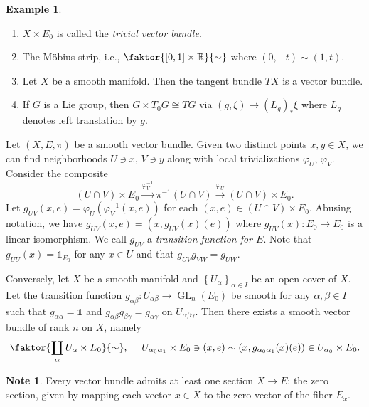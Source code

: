 \documentclass[10pt,letterpaper,cm]{nupset}
\theoremstyle{definition}
\newtheorem{exmp}[definition]{Example}
\newtheorem{note}[definition]{Note}
\theoremstyle{theorem}
\theoremstyle{remark}
\newcommand{\R}{\mathbb{R}}
\newcommand{\1}{\mathbb{1}}
\newcommand{\0}{\vec 0}
\DeclareMathOperator{\GL}{GL}
\begin{document}
\begin{exmp} $ $
\begin{enumerate}
\item $X \times E_0$ is called the \textit{trivial vector bundle}.
\item  The M\"obius strip, i.e., $\faktor{[0,1]\times \R}{\sim}$ where $(0, {-t}) \sim (1, t)$.
\item Let $X$ be a smooth manifold. Then the tangent bundle $T{X}$ is a vector bundle. 
\item If $G$ is a Lie group, then $ G \times T_0{G} \cong T{G}$ via $ (g, \xi) \mapsto \left(L_g\right)_{\ast}{\xi}$ where  $L_g$ denotes left translation by $g$. 
\end{enumerate}
\end{exmp}

\medskip

Let $(X, E, \pi)$ be a smooth vector bundle. Given two distinct points $x,y \in X$, we can find neighborhoods $U\ni x$, $V\ni y$ along with local trivializations $\varphi_U$, $\varphi_V$. Consider the composite $$ \left(U \cap V\right) \times E_0 \overset{\varphi^{-1}_V}{\longrightarrow} \pi^{-1}\left(U \cap V\right) \overset{\varphi_U}{\longrightarrow} \left(U \cap V\right) \times E_0    .$$ Let $g_{UV}(x,e) = \varphi_U(\varphi_V^{-1}(x,e))$ for each $(x,e) \in \left(U \cap V\right) \times E_0$. Abusing notation, we have $g_{UV}(x,e) = \left(x, g_{UV}(x)(e)\right)$ where $g_{UV}(x) : E_0 \to E_0$ is a linear isomorphism. We call $g_{UV}$ a \textit{transition function for $E$}. Note that $g_{UU}(x) = \1_{E_0}$ for any $x\in U$ and that $g_{UV}g_{VW} = g_{UW}$. 

\smallskip

Conversely,  let $X$ be a smooth manifold and $\left\{U_{\alpha}\right\}_{\alpha \in I}$ be an open cover of $X$. Let the transition function $g_{\alpha{\beta}} : U_{\alpha{\beta}} \to \GL_n(E_0)$ be smooth for any $\alpha, \beta \in I$ such that $g_{\alpha{\alpha}} = \1$ and $g_{\alpha{\beta}}g_{\beta{\gamma}} = g_{\alpha{\gamma}}$ on $U_{\alpha{\beta}{\gamma}}$.
 Then there exists a smooth vector bundle of rank $n$ on $X$, namely 
 \[
 \faktor{\coprod_{\alpha}{U_{\alpha} \times E_0}}{\sim}, \ \quad U_{\alpha_0{\alpha_1}} \times E_0 \ni (x,e) \sim \left(x, g_{\alpha_0{\alpha_1}}(x)(e)\right) \in U_{\alpha_0}\times E_0 .
 \]

\smallskip

\begin{note} 
 Every vector bundle admits at least one section $X\to E$: the zero section, given by mapping each vector $x \in X$ to the zero vector of the fiber $E_x$.
\end{note}
\end{document}

